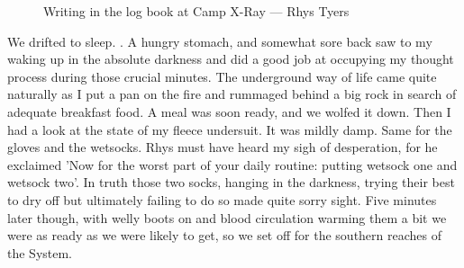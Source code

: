 \begin{figure}[t]
\checkoddpage \ifoddpage \forcerectofloat \else \forceversofloat \fi
\centering
{}
\caption{Writing in the log book at Camp X-Ray --- Rhys Tyers}
\label{Camp X-Ray}
\end{figure}

We drifted to sleep. . A hungry stomach, and somewhat sore back saw to my waking up in the absolute darkness and did a good job at occupying my thought process during those crucial minutes. The underground way of life came quite naturally as I put a pan on the fire and rummaged behind a big rock in search of adequate breakfast food. A meal was soon ready, and we wolfed it down. Then I had a look at the state of my fleece undersuit. It was mildly damp. Same for the gloves and the wetsocks. Rhys must have heard my sigh of desperation, for he exclaimed 'Now for the worst part of your daily routine: putting wetsock one and wetsock two'. In truth those two socks, hanging in the darkness, trying their best to dry off but ultimately failing to do so made quite sorry sight. Five minutes later though, with welly boots on and blood circulation warming them a bit we were as ready as we were likely to get, so we set off for the southern reaches of the System. 
\begin{figure}[t!]
\end{figure}

